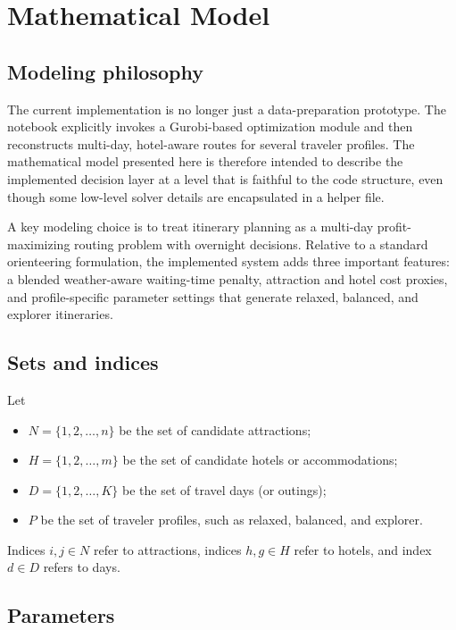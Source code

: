 \documentclass[12pt,a4paper]{article}
\begin{document}
\section{Mathematical Model}

\subsection{Modeling philosophy}

The current implementation is no longer just a data-preparation prototype. The notebook explicitly invokes a Gurobi-based optimization module and then reconstructs multi-day, hotel-aware routes for several traveler profiles. The mathematical model presented here is therefore intended to describe the implemented decision layer at a level that is faithful to the code structure, even though some low-level solver details are encapsulated in a helper file.

A key modeling choice is to treat itinerary planning as a multi-day profit-maximizing routing problem with overnight decisions. Relative to a standard orienteering formulation, the implemented system adds three important features: a blended weather-aware waiting-time penalty, attraction and hotel cost proxies, and profile-specific parameter settings that generate relaxed, balanced, and explorer itineraries.

\subsection{Sets and indices}

Let
\begin{itemize}[leftmargin=2em]
    \item $N = \{1,2,\dots,n\}$ be the set of candidate attractions;
    \item $H = \{1,2,\dots,m\}$ be the set of candidate hotels or accommodations;
    \item $D = \{1,2,\dots,K\}$ be the set of travel days (or outings);
    \item $P$ be the set of traveler profiles, such as relaxed, balanced, and explorer.
\end{itemize}

Indices $i,j \in N$ refer to attractions, indices $h,g \in H$ refer to hotels, and index $d \in D$ refers to days.

\subsection{Parameters}
\end{document}
